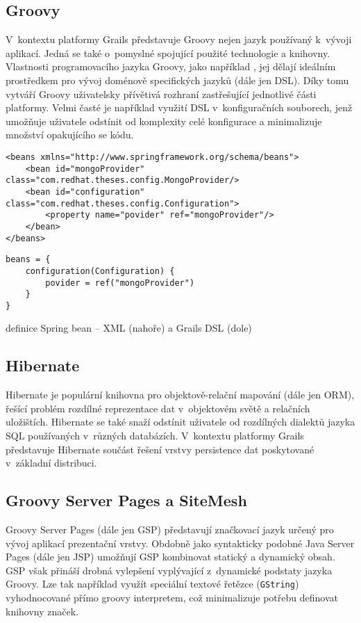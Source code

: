 \subsection{Groovy}
V~kontextu platformy Grails představuje Groovy nejen jazyk používaný k~vývoji aplikací. Jedná se také o~pomyslné  spojující použité technologie a knihovny. Vlastnosti programovacího jazyka Groovy, jako například , jej dělají ideálním prostředkem pro vývoj doménově specifických jazyků (dále jen DSL).  Díky tomu vytváří Groovy uživatelsky přívětivá rozhraní zastřešující jednotlivé části platformy. Velmi časté je například využití DSL v~konfiguračních souborech, jenž umožňuje uživatele odstínit od komplexity celé konfigurace a minimalizuje množství opakujícího se kódu.
\begin{example}
\centering
\begin{lstlisting}
<beans xmlns="http://www.springframework.org/schema/beans">
    <bean id="mongoProvider" class="com.redhat.theses.config.MongoProvider/>
    <bean id="configuration" class="com.redhat.theses.config.Configuration">
        <property name="povider" ref="mongoProvider"/>
    </bean>
</beans>
\end{lstlisting}
\begin{lstlisting}
beans = {
    configuration(Configuration) {
        povider = ref("mongoProvider")
    }
}
\end{lstlisting}
\caption{definice Spring bean -- XML (nahoře) a Grails DSL (dole)}
\end{example}

\subsection{Hibernate}
Hibernate je populární knihovna pro objektově-relační mapování (dále jen ORM), řešící problém rozdílné reprezentace dat v~objektovém světě a relačních uložištích. Hibernate se také snaží odstínit uživatele od rozdílných dialektů jazyka SQL používaných v~různých databázích. V~kontextu platformy Grails představuje Hibernate součást řešení vrstvy persistence dat poskytované v~základní distribuci.

\subsection{Groovy Server Pages a SiteMesh}
Groovy Server Pages (dále jen GSP) představují značkovací jazyk určený pro vývoj aplikací prezentační vrstvy. Obdobně jako syntakticky podobné Java Server Pages (dále jen JSP) umožňují GSP kombinovat statický a dynamický obsah. GSP však přináší drobná vylepšení vyplývající z~dynamické podstaty jazyka Groovy. Lze tak například využít speciální textové řetězce (\texttt{GString}) vyhodnocované přímo groovy interpretem, což minimalizuje potřebu definovat knihovny značek.

